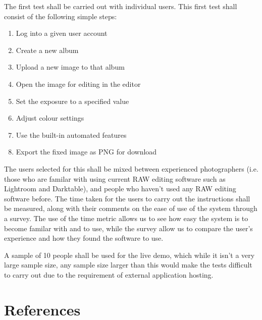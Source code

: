 \documentclass[12pt,a4paper]{article}
\begin{document}
The first test shall be carried out with individual users. This first test shall consist of
the following simple steps:

\begin{enumerate}
  \item Log into a given user account
  \item Create a new album
  \item Upload a new image to that album
  \item Open the image for editing in the editor
  \item Set the exposure to a specified value
  \item Adjust colour settings
  \item Use the built-in automated features
  \item Export the fixed image as PNG for download
\end{enumerate}

The users selected for this shall be mixed between experienced photographers (i.e. those
who are familar with using current RAW editing software such as Lightroom and Darktable), and
people who haven't used any RAW editing software before. The time taken for the users to carry
out the instructions shall be measured, along with their comments on the ease of use of the system through a survey.
The use of the time metric allows us to see how easy the system is to become familar with and to use, while the survey
allow us to compare the user's experience and how they found the software to use.

A sample of 10 people shall be used for the live demo, which while it isn't a very large sample size,
any sample size larger than this would make the tests difficult to carry out due to the requirement of external
application hosting.

\section{References}

%


\end{document}

